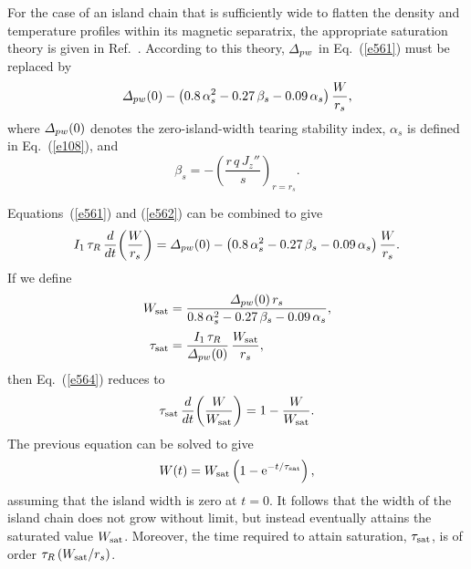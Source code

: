 \documentclass[12pt,prb,aps]{revtex4-1}
\begin{document}
For the case of an island chain that is sufficiently wide to flatten  the density and temperature profiles within its magnetic separatrix, the appropriate saturation theory is given in Ref.~.
According to this theory, ${\mit\Delta}_{pw}$ in Eq.~(\ref{e561}) must be replaced by
\begin{equation}\label{e562}
{\mit\Delta}_{pw}(0) - \left(0.8\,\alpha_s^{2}-0.27\,\beta_s - 0.09\,\alpha_s\right)\frac{W}{r_s},
\end{equation}
where ${\mit\Delta}_{pw}(0)$ denotes the zero-island-width tearing stability index, $\alpha_s$ is defined in  Eq.~(\ref{e108}),
and
\begin{equation}
\beta_s = -\left(\frac{r\,q\,J_z''}{s}\right)_{r=r_s}.
\end{equation}

Equations~(\ref{e561}) and (\ref{e562}) can be combined to give
\begin{equation}\label{e564}
I_1\,\tau_R\,\frac{d}{dt}\!\left(\frac{W}{r_s}\right)= {\mit\Delta}_{pw}(0)- \left(0.8\,\alpha_s^{2}-0.27\,\beta_s - 0.09\,\alpha_s\right)\frac{W}{r_s}.
\end{equation}
If we define
\begin{align}
W_{\rm sat} &= \frac{{\mit\Delta}_{pw}(0)\,r_s}{0.8\,\alpha_s^{2}-0.27\,\beta_s - 0.09\,\alpha_s},\\[0.5ex]
\tau_{\rm sat} &= \frac{I_1\,\tau_R}{{\mit\Delta}_{pw}(0)}\,\frac{W_{\rm sat}}{r_s},
\end{align}
then Eq.~(\ref{e564}) reduces to
\begin{equation}
\tau_{\rm sat} \,\frac{d}{dt}\!\left(\frac{W}{W_{\rm sat}}\right) = 1-\frac{W}{W_{\rm sat}}.
\end{equation}
The previous equation can be solved to give
\begin{equation}
W(t) = W_{\rm sat}\left(1-{\rm e}^{-t/\tau_{\rm sat}}\right),
\end{equation}
assuming that the island width is zero at $t=0$. It follows that the width of the island chain does not grow without limit, 
but instead eventually attains the saturated 
value $W_{\rm sat}$. Moreover, the time required to attain saturation, $\tau_{\rm sat}$, is of order $\tau_R\,(W_{\rm sat}/r_s)$. 
\end{document}
